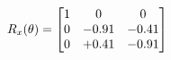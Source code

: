 \documentclass[preview]{standalone}
\begin{document}
\begin{align*}
\special{dvisvgm:raw <g id='unique000'>}R_{x}(\theta) = \begin{bmatrix}1 & 0 & 0 \\0 & -0.91 & -0.41 \\0 & +0.41 & -0.91\end{bmatrix}\special{dvisvgm:raw </g>}
\end{align*}
\end{document}
